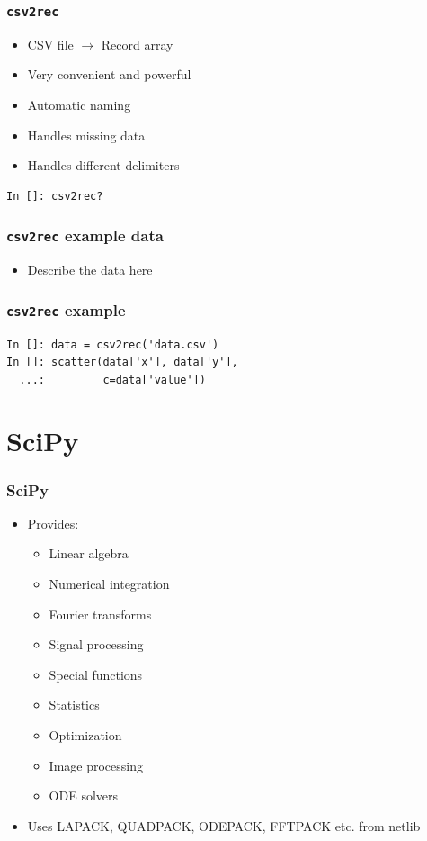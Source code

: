 \documentclass[14pt,compress]{beamer}
\newcommand{\typ}[1]{\lstinline{#1}}
\begin{document}
\begin{frame}[fragile]
    \frametitle{\typ{csv2rec}}
    \begin{itemize}
        \item CSV file $\rightarrow$ Record array
        \item Very convenient and powerful
        \item Automatic naming
        \item Handles missing data
        \item Handles different delimiters
    \end{itemize}
    \begin{lstlisting}
In []: csv2rec?
    \end{lstlisting}
\end{frame}

\begin{frame}[fragile]
    \frametitle{\typ{csv2rec} example data}
    \begin{itemize}
        \item Describe the data here
    \end{itemize}
\end{frame}

\begin{frame}[fragile]
    \frametitle{\typ{csv2rec} example}
    \begin{lstlisting}
In []: data = csv2rec('data.csv')
In []: scatter(data['x'], data['y'], 
  ...:         c=data['value'])
    \end{lstlisting}
\end{frame}


\section{SciPy}
\begin{frame}[plain]
  \frametitle{SciPy}
  \begin{itemize}
  \item Provides:
    \begin{itemize}
    \item Linear algebra
    \item Numerical integration
    \item Fourier transforms
    \item Signal processing
    \item Special functions
    \item Statistics
    \item Optimization
    \item Image processing
    \item ODE solvers
    \end{itemize}
  \item Uses LAPACK, QUADPACK, ODEPACK, FFTPACK etc. from netlib
  \end{itemize}
\end{frame}
\end{document}
